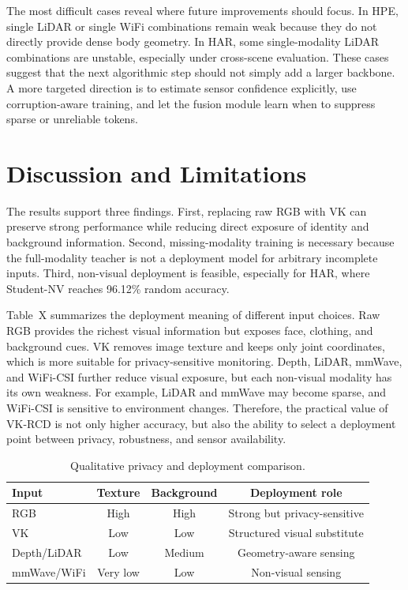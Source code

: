 \documentclass[journal, twocolumn, transmag]{IEEEtran}
\newcommand{\method}{VK-RCD}
\newcommand{\smalltab}{\scriptsize}
\begin{document}
The most difficult cases reveal where future improvements should focus. In HPE, single LiDAR or single WiFi combinations remain weak because they do not directly provide dense body geometry. In HAR, some single-modality LiDAR combinations are unstable, especially under cross-scene evaluation. These cases suggest that the next algorithmic step should not simply add a larger backbone. A more targeted direction is to estimate sensor confidence explicitly, use corruption-aware training, and let the fusion module learn when to suppress sparse or unreliable tokens.

\section{Discussion and Limitations}
The results support three findings. First, replacing raw RGB with VK can preserve strong performance while reducing direct exposure of identity and background information. Second, missing-modality training is necessary because the full-modality teacher is not a deployment model for arbitrary incomplete inputs. Third, non-visual deployment is feasible, especially for HAR, where Student-NV reaches 96.12\% random accuracy.

Table~X summarizes the deployment meaning of different input choices. Raw RGB provides the richest visual information but exposes face, clothing, and background cues. VK removes image texture and keeps only joint coordinates, which is more suitable for privacy-sensitive monitoring. Depth, LiDAR, mmWave, and WiFi-CSI further reduce visual exposure, but each non-visual modality has its own weakness. For example, LiDAR and mmWave may become sparse, and WiFi-CSI is sensitive to environment changes. Therefore, the practical value of \method{} is not only higher accuracy, but also the ability to select a deployment point between privacy, robustness, and sensor availability.

\begin{table}[t]
	\caption{Qualitative privacy and deployment comparison.}
	\label{tab:privacy}
	\centering
	\smalltab
	\begin{tabular}{lccc}
		\toprule
		Input & Texture & Background & Deployment role\\
		\midrule
		RGB & High & High & Strong but privacy-sensitive\\
		VK & Low & Low & Structured visual substitute\\
		Depth/LiDAR & Low & Medium & Geometry-aware sensing\\
		mmWave/WiFi & Very low & Low & Non-visual sensing\\
		\bottomrule
	\end{tabular}
\end{table}
\end{document}
